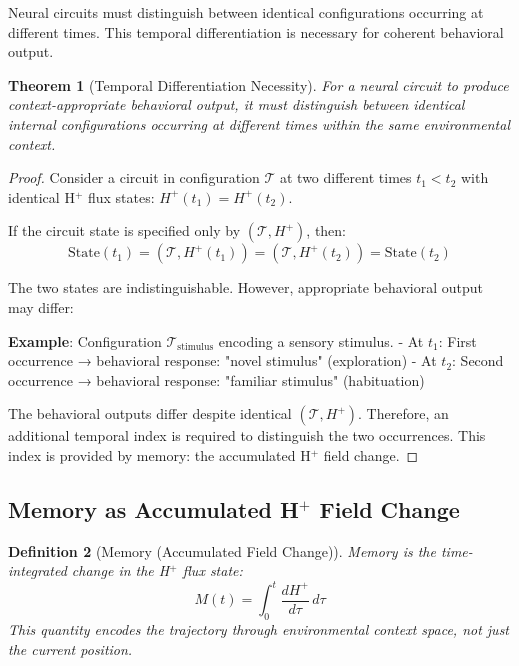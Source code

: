 \documentclass[aps,prd,twocolumn,superscriptaddress,floatfix,nofootinbib]{revtex4-2}
\newtheorem{theorem}{Theorem}[section]
\newtheorem{definition}[theorem]{Definition}
\theoremstyle{remark}
\begin{document}
Neural circuits must distinguish between identical configurations occurring at different times. This temporal differentiation is necessary for coherent behavioral output.

\begin{theorem}[Temporal Differentiation Necessity]
\label{thm:temporal_necessity}
For a neural circuit to produce context-appropriate behavioral output, it must distinguish between identical internal configurations occurring at different times within the same environmental context.
\end{theorem}

\begin{proof}
Consider a circuit in configuration $\mathcal{T}$ at two different times $t_1 < t_2$ with identical H$^+$ flux states: $H^+(t_1) = H^+(t_2)$.

If the circuit state is specified only by $(\mathcal{T}, H^+)$, then:
$$
\text{State}(t_1) = (\mathcal{T}, H^+(t_1)) = (\mathcal{T}, H^+(t_2)) = \text{State}(t_2)
$$

The two states are indistinguishable. However, appropriate behavioral output may differ:

\textbf{Example}: Configuration $\mathcal{T}_{\text{stimulus}}$ encoding a sensory stimulus.
- At $t_1$: First occurrence → behavioral response: "novel stimulus" (exploration)
- At $t_2$: Second occurrence → behavioral response: "familiar stimulus" (habituation)

The behavioral outputs differ despite identical $(\mathcal{T}, H^+)$. Therefore, an additional temporal index is required to distinguish the two occurrences. This index is provided by memory: the accumulated H$^+$ field change.
\end{proof}

\subsection{Memory as Accumulated H$^+$ Field Change}

\begin{definition}[Memory (Accumulated Field Change)]
\label{def:memory_detailed}
Memory is the time-integrated change in the H$^+$ flux state:
\begin{equation}
\boxed{M(t) = \int_0^t \frac{dH^+}{d\tau} \, d\tau}
\end{equation}
This quantity encodes the trajectory through environmental context space, not just the current position.
\end{definition}
\end{document}
